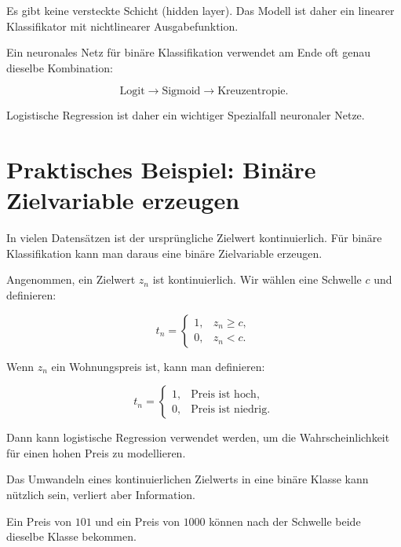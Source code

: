 Es gibt keine versteckte Schicht (hidden layer).
Das Modell ist daher ein linearer Klassifikator mit nichtlinearer Ausgabefunktion.

\begin{conceptbox}
Ein neuronales Netz für binäre Klassifikation verwendet am Ende oft genau dieselbe Kombination:

\[
    \text{Logit}
    \longrightarrow
    \text{Sigmoid}
    \longrightarrow
    \text{Kreuzentropie}.
\]

Logistische Regression ist daher ein wichtiger Spezialfall neuronaler Netze.
\end{conceptbox}

\section{Praktisches Beispiel: Binäre Zielvariable erzeugen}

In vielen Datensätzen ist der ursprüngliche Zielwert kontinuierlich.
Für binäre Klassifikation kann man daraus eine binäre Zielvariable erzeugen.

Angenommen, ein Zielwert \(z_n\) ist kontinuierlich.
Wir wählen eine Schwelle \(c\) und definieren:

\[
    t_n
    =
    \begin{cases}
        1, & z_n \geq c, \\
        0, & z_n < c.
    \end{cases}
\]

\begin{examplebox}
Wenn \(z_n\) ein Wohnungspreis ist, kann man definieren:

\[
    t_n
    =
    \begin{cases}
        1, & \text{Preis ist hoch}, \\
        0, & \text{Preis ist niedrig}.
    \end{cases}
\]

Dann kann logistische Regression verwendet werden, um die Wahrscheinlichkeit für einen hohen Preis zu modellieren.
\end{examplebox}

\begin{notebox}
Das Umwandeln eines kontinuierlichen Zielwerts in eine binäre Klasse kann nützlich sein, verliert aber Information.

Ein Preis von \(101\) und ein Preis von \(1000\) können nach der Schwelle beide dieselbe Klasse bekommen.
\end{notebox}


